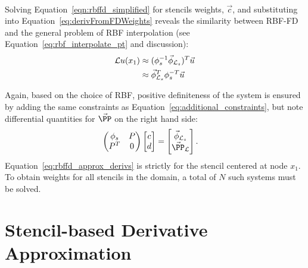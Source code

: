 \documentclass{report}
\begin{document}
{\begin{align}
                         \label{eqn:rbffd_simplified}
        \end{align} 
Solving Equation~\ref{eqn:rbffd_simplified} for stencils weights, $\vec{c}$, and substituting into Equation~\ref{eq:derivFromFDWeights} reveals the similarity between RBF-FD and the general problem of RBF interpolation (see Equation~\ref{eq:rbf_interpolate_pt} and discussion): 
        \begin{align*} 
        \mathcal{L}u(x_1) &\approx (\phi^{-1}_s \vec{\phi}_{\mathcal{L}_s})^T \vec{u} \\
        &\approx \vec{\phi}_{\mathcal{L}_s}^T \phi^{-T}_s \vec{u}
        \label{eq:rbffd_approx_derivs}
        \end{align*}
        
	
Again, based on the choice of RBF, positive definiteness of the system is ensured by adding the same constraints as Equation~\ref{eq:additional_constraints}, but note differential quantities for $\vec{\PP}$ on the right hand side: 
	\begin{align}
		\begin{pmatrix}
		\phi_s & P \\
		P^T & 0
		\end{pmatrix} \begin{bmatrix}
							c \\ 
							d
							\end{bmatrix}
				 &= \begin{bmatrix}
							\vec{\phi}_{\diffop{}_s} \\
							\vec{\PP}_{\diffop{}}
							 \end{bmatrix}.
	\end{align}
Equation~\ref{eq:rbffd_approx_derivs} is strictly for the stencil centered at node $x_1$. To obtain weights for all stencils in the domain, a total of $N$ such systems must be solved. %





\section{Stencil-based Derivative Approximation}

}
\end{document}
